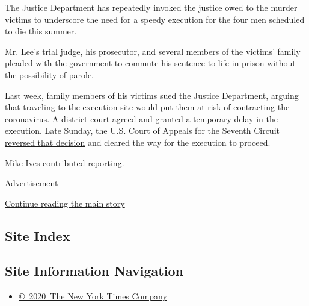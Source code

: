 The Justice Department has repeatedly invoked the justice owed to the
murder victims to underscore the need for a speedy execution for the
four men scheduled to die this summer.

Mr. Lee's trial judge, his prosecutor, and several members of the
victims' family pleaded with the government to commute his sentence to
life in prison without the possibility of parole.

Last week, family members of his victims sued the Justice Department,
arguing that traveling to the execution site would put them at risk of
contracting the coronavirus. A district court agreed and granted a
temporary delay in the execution. Late Sunday, the U.S. Court of Appeals
for the Seventh Circuit
\href{https://www.nytimes.com/2020/07/12/us/politics/execution-daniel-lewis-lee.html?searchResultPosition=2}{reversed
that decision} and cleared the way for the execution to proceed.

Mike Ives contributed reporting.

Advertisement

\protect\hyperlink{after-bottom}{Continue reading the main story}

\hypertarget{site-index}{%
\subsection{Site Index}\label{site-index}}

\hypertarget{site-information-navigation}{%
\subsection{Site Information
Navigation}\label{site-information-navigation}}

\begin{itemize}
\tightlist
\item
  \href{https://help.nytimes.com/hc/en-us/articles/115014792127-Copyright-notice}{©~2020~The
  New York Times Company}
\end{itemize}

